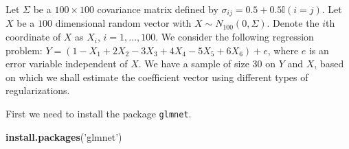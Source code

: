 \documentclass[
]{book}
\newenvironment{Shaded}{\begin{snugshade}}{\end{snugshade}}
\newcommand{\CommentTok}[1]{\textcolor[rgb]{0.56,0.35,0.01}{\textit{#1}}}
\newcommand{\DataTypeTok}[1]{\textcolor[rgb]{0.13,0.29,0.53}{#1}}
\newcommand{\DecValTok}[1]{\textcolor[rgb]{0.00,0.00,0.81}{#1}}
\newcommand{\FloatTok}[1]{\textcolor[rgb]{0.00,0.00,0.81}{#1}}
\newcommand{\KeywordTok}[1]{\textcolor[rgb]{0.13,0.29,0.53}{\textbf{#1}}}
\newcommand{\NormalTok}[1]{#1}
\newcommand{\OperatorTok}[1]{\textcolor[rgb]{0.81,0.36,0.00}{\textbf{#1}}}
\newcommand{\StringTok}[1]{\textcolor[rgb]{0.31,0.60,0.02}{#1}}
\begin{document}
Let \(\Sigma\) be a \(100 \times 100\) covariance matrix defined by \(\sigma_{i j} = 0.5 + 0.5 \mathbb{I}(i = j)\). Let \(X\) be a \(100\) dimensional random vector with \(X \sim N_{100}( 0, \Sigma )\). Denote the \(i\)th coordinate of \(X\) as \(X_i\), \(i = 1, \ldots, 100\). We consider the following regression problem: \(Y = (1 - X_1 + 2 X_2 - 3 X_3 + 4 X_4 - 5 X_5 + 6 X_6) + e\), where \(e\) is an error variable independent of \(X\). We have a sample of size \(30\) on \(Y\) and \(X\), based on which we shall estimate the coefficient vector using different types of regularizations.

\begin{Shaded}
\end{Shaded}

First we need to install the package \texttt{glmnet}.

\begin{Shaded}
\begin{Highlighting}[]
\KeywordTok{install.packages}\NormalTok{(}\StringTok{'glmnet'}\NormalTok{)}
\end{Highlighting}
\end{Shaded}
\end{document}
